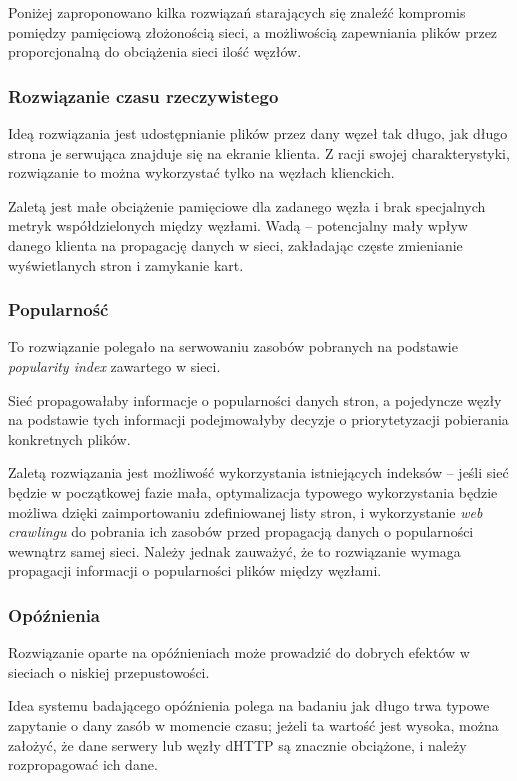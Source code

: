 Poniżej zaproponowano kilka rozwiązań starających się znaleźć kompromis pomiędzy pamięciową złożonością sieci, a możliwością zapewniania plików przez proporcjonalną do obciążenia sieci ilość węzłów.

\subsubsection{Rozwiązanie czasu rzeczywistego}
Ideą rozwiązania jest udostępnianie plików przez dany węzeł tak długo, jak długo strona je serwująca znajduje się na ekranie klienta. Z racji swojej charakterystyki, rozwiązanie to można wykorzystać tylko na węzłach klienckich.

Zaletą jest małe obciążenie pamięciowe dla zadanego węzła i brak specjalnych metryk współdzielonych między węzłami.
Wadą -- potencjalny mały wpływ danego klienta na propagację danych w sieci, zakładając częste zmienianie wyświetlanych stron i zamykanie kart.

\subsubsection{Popularność}
To rozwiązanie polegało na serwowaniu zasobów pobranych na podstawie {\em popularity index} zawartego w sieci.

Sieć propagowałaby informacje o popularności danych stron, a pojedyncze węzły na podstawie tych informacji podejmowałyby decyzje o priorytetyzacji pobierania konkretnych plików.

Zaletą rozwiązania jest możliwość wykorzystania istniejących indeksów -- jeśli sieć będzie w początkowej fazie mała, optymalizacja typowego wykorzystania będzie możliwa dzięki zaimportowaniu zdefiniowanej listy stron, i wykorzystanie {\em web crawlingu} do pobrania ich zasobów przed propagacją danych o popularności wewnątrz samej sieci. Należy jednak zauważyć, że to rozwiązanie wymaga propagacji informacji o popularności plików między węzłami.

\subsubsection{Opóźnienia}
Rozwiązanie oparte na opóźnieniach może prowadzić do dobrych efektów w sieciach o niskiej przepustowości.

Idea systemu badającego opóźnienia polega na badaniu jak długo trwa typowe zapytanie o dany zasób w momencie czasu; jeżeli ta wartość jest wysoka, można założyć, że dane serwery lub węzły dHTTP są znacznie obciążone, i należy rozpropagować ich dane.

